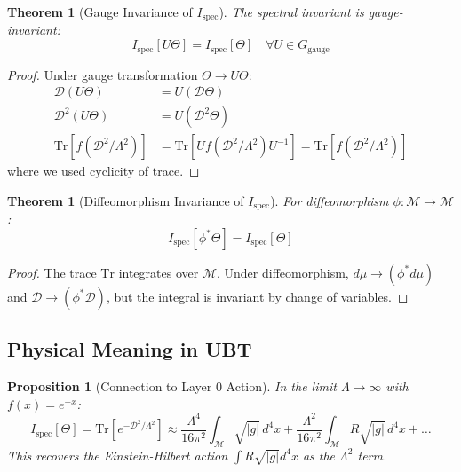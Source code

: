 \documentclass[12pt]{article}
\newtheorem{theorem}[definition]{Theorem}
\newtheorem{proposition}[definition]{Proposition}
\newcommand{\M}{\mathcal{M}}
\newcommand{\Tr}{\mathrm{Tr}}
\begin{document}
\begin{theorem}[Gauge Invariance of $I_{\text{spec}}$]
The spectral invariant is gauge-invariant:
\begin{equation}
I_{\text{spec}}[U \Theta] = I_{\text{spec}}[\Theta] \quad \forall U \in G_{\text{gauge}}
\end{equation}
\end{theorem}

\begin{proof}
Under gauge transformation $\Theta \to U \Theta$:
\begin{align}
\mathcal{D}(U \Theta) &= U (\mathcal{D} \Theta) \\
\mathcal{D}^2(U \Theta) &= U (\mathcal{D}^2 \Theta) \\
\Tr[f(\mathcal{D}^2/\Lambda^2)] &= \Tr[U f(\mathcal{D}^2/\Lambda^2) U^{-1}] = \Tr[f(\mathcal{D}^2/\Lambda^2)]
\end{align}
where we used cyclicity of trace.
\end{proof}

\begin{theorem}[Diffeomorphism Invariance of $I_{\text{spec}}$]
For diffeomorphism $\phi: \M \to \M$:
\begin{equation}
I_{\text{spec}}[\phi^* \Theta] = I_{\text{spec}}[\Theta]
\end{equation}
\end{theorem}

\begin{proof}
The trace $\Tr$ integrates over $\M$. Under diffeomorphism, $d\mu \to (\phi^* d\mu)$ and $\mathcal{D} \to (\phi^* \mathcal{D})$, but the integral is invariant by change of variables.
\end{proof}

\subsection{Physical Meaning in UBT}

\begin{proposition}[Connection to Layer 0 Action]
In the limit $\Lambda \to \infty$ with $f(x) = e^{-x}$:
\begin{equation}
I_{\text{spec}}[\Theta] = \Tr[e^{-\mathcal{D}^2/\Lambda^2}] \approx \frac{\Lambda^4}{16\pi^2} \int_\M \sqrt{|g|} \, d^4x + \frac{\Lambda^2}{16\pi^2} \int_\M R \sqrt{|g|} \, d^4x + \ldots
\end{equation}
This recovers the Einstein-Hilbert action $\int R \sqrt{|g|} d^4x$ as the $\Lambda^2$ term.
\end{proposition}
\end{document}
